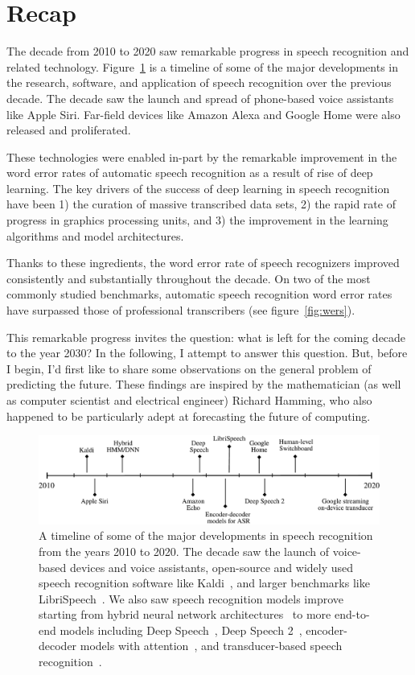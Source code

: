 \section{Recap}
\label{sec:recap}

The decade from 2010 to 2020 saw remarkable progress in speech recognition and
related technology. Figure~\ref{fig:asr_timeline} is a timeline of some of the
major developments in the research, software, and application of speech
recognition over the previous decade. The decade saw the launch and spread of
phone-based voice assistants like Apple Siri. Far-field devices like Amazon
Alexa and Google Home were also released and proliferated.

These technologies were enabled in-part by the remarkable improvement in the
word error rates of automatic speech recognition as a result of rise of deep
learning. The key drivers of the success of deep learning in speech recognition
have been 1) the curation of massive transcribed data sets, 2) the rapid rate
of progress in graphics processing units, and 3) the improvement in the
learning algorithms and model architectures.

Thanks to these ingredients, the word error rate of speech recognizers improved
consistently and substantially throughout the decade. On two of the most
commonly studied benchmarks, automatic speech recognition word error rates have
surpassed those of professional transcribers (see figure~\ref{fig:wers}).

This remarkable progress invites the question: what is left for the coming
decade to the year 2030? In the following, I attempt to answer this question.
But, before I begin, I'd first like to share some observations on the general
problem of predicting the future. These findings are inspired by the
mathematician (as well as computer scientist and electrical engineer) Richard
Hamming, who also happened to be particularly adept at forecasting the future
of computing.

\begin{figure}
\centering
\includegraphics[width=\linewidth]{figures/asr_timeline}
\caption{A timeline of some of the major developments in speech recognition
    from the years 2010 to 2020. The decade saw the launch of
    voice-based devices and voice assistants, open-source and widely used
    speech recognition software like Kaldi~\citep{povey2011kaldi}, and larger
    benchmarks like LibriSpeech~\citep{panayotov2015librispeech}. We also saw
    speech recognition models improve starting from hybrid neural network
    architectures~\citep{hinton2012deep} to more end-to-end models including
    Deep Speech~\citep{hannun2014deep}, Deep Speech 2~\citep{amodei2016deep},
    encoder-decoder models with attention~\citep{chorowski2015attention}, and
    transducer-based speech recognition~\citep{he2019streaming}.}
\label{fig:asr_timeline}
\end{figure}

